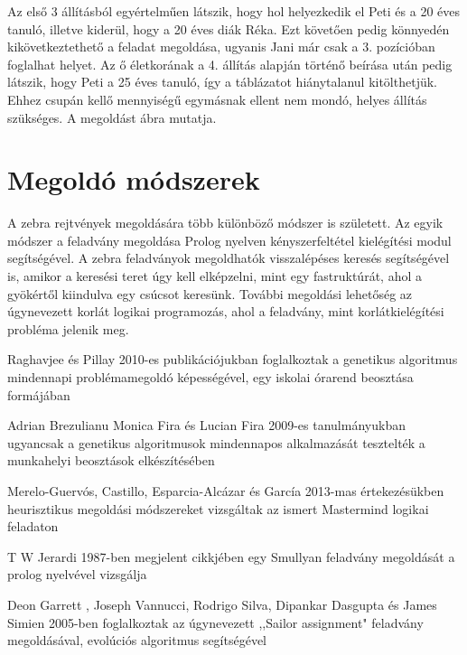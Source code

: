 \documentclass[12pt,a4paper,oneside]{report}
\begin{document}
Az első 3 állításból egyértelműen látszik, hogy hol helyezkedik el Peti és a 20 éves tanuló, illetve kiderül, hogy a 20 éves diák Réka. Ezt követően pedig könnyedén kikövetkeztethető a feladat megoldása, ugyanis Jani már csak a 3. pozícióban foglalhat helyet. Az ő életkorának a 4. állítás alapján történő beírása után pedig látszik, hogy Peti a 25 éves tanuló, így a táblázatot hiánytalanul kitölthetjük. Ehhez csupán kellő mennyiségű egymásnak ellent nem mondó, helyes állítás szükséges. A megoldást  ábra mutatja.

    \section{Megoldó módszerek} %

A zebra rejtvények megoldására több különböző módszer is született. 
Az egyik módszer a feladvány megoldása Prolog nyelven kényszerfeltétel kielégítési modul segítségével. 
A zebra feladványok megoldhatók visszalépéses keresés segítségével is, amikor a keresési teret úgy kell elképzelni, mint egy fastruktúrát, ahol a gyökértől kiindulva egy csúcsot keresünk.
További megoldási lehetőség az úgynevezett korlát logikai programozás, ahol a feladvány, mint korlátkielégítési probléma jelenik meg.


Raghavjee és Pillay 2010-es publikációjukban foglalkoztak a genetikus algoritmus mindennapi problémamegoldó képességével, egy iskolai órarend beosztása formájában\cite{Raghavjee:2010:IGA:1899503.1899555}

Adrian Brezulianu Monica Fira és Lucian Fira 2009-es tanulmányukban ugyancsak a genetikus algoritmusok mindennapos alkalmazását tesztelték a munkahelyi beosztások elkészítésében\cite{Brezulianu:2009:GAA:1644993.1645085}

Merelo-Guervós, Castillo, Esparcia-Alcázar és García 2013-mas értekezésükben heurisztikus megoldási módszereket vizsgáltak az ismert Mastermind logikai feladaton\cite{Merelo-Guervos:2013:IES:2463372.2463473}

T W Jerardi	1987-ben megjelent cikkjében egy Smullyan feladvány megoldását a prolog nyelvével vizsgálja\cite{Jerardi:1987:PPL:24714.24722}

Deon Garrett	, Joseph Vannucci, Rodrigo Silva, Dipankar Dasgupta és James Simien 2005-ben foglalkoztak az úgynevezett ,,Sailor assignment" feladvány megoldásával, evolúciós algoritmus segítségével\cite{Garrett:2005:GAS:1068009.1068333}
\end{document}
